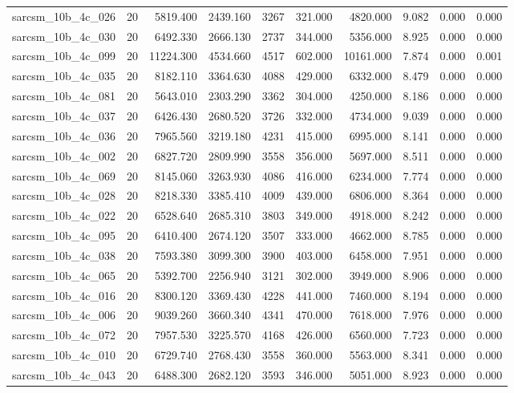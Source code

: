 \begin{tabular}{lrrrrrrrrr}
sarcsm\_10b\_4c\_026 & 20 & 5819.400 & 2439.160 & 3267 & 321.000 & 4820.000 & 9.082 & 0.000 & 0.000 \\
sarcsm\_10b\_4c\_030 & 20 & 6492.330 & 2666.130 & 2737 & 344.000 & 5356.000 & 8.925 & 0.000 & 0.000 \\
sarcsm\_10b\_4c\_099 & 20 & 11224.300 & 4534.660 & 4517 & 602.000 & 10161.000 & 7.874 & 0.000 & 0.001 \\
sarcsm\_10b\_4c\_035 & 20 & 8182.110 & 3364.630 & 4088 & 429.000 & 6332.000 & 8.479 & 0.000 & 0.000 \\
sarcsm\_10b\_4c\_081 & 20 & 5643.010 & 2303.290 & 3362 & 304.000 & 4250.000 & 8.186 & 0.000 & 0.000 \\
sarcsm\_10b\_4c\_037 & 20 & 6426.430 & 2680.520 & 3726 & 332.000 & 4734.000 & 9.039 & 0.000 & 0.000 \\
sarcsm\_10b\_4c\_036 & 20 & 7965.560 & 3219.180 & 4231 & 415.000 & 6995.000 & 8.141 & 0.000 & 0.000 \\
sarcsm\_10b\_4c\_002 & 20 & 6827.720 & 2809.990 & 3558 & 356.000 & 5697.000 & 8.511 & 0.000 & 0.000 \\
sarcsm\_10b\_4c\_069 & 20 & 8145.060 & 3263.930 & 4086 & 416.000 & 6234.000 & 7.774 & 0.000 & 0.000 \\
sarcsm\_10b\_4c\_028 & 20 & 8218.330 & 3385.410 & 4009 & 439.000 & 6806.000 & 8.364 & 0.000 & 0.000 \\
sarcsm\_10b\_4c\_022 & 20 & 6528.640 & 2685.310 & 3803 & 349.000 & 4918.000 & 8.242 & 0.000 & 0.000 \\
sarcsm\_10b\_4c\_095 & 20 & 6410.400 & 2674.120 & 3507 & 333.000 & 4662.000 & 8.785 & 0.000 & 0.000 \\
sarcsm\_10b\_4c\_038 & 20 & 7593.380 & 3099.300 & 3900 & 403.000 & 6458.000 & 7.951 & 0.000 & 0.000 \\
sarcsm\_10b\_4c\_065 & 20 & 5392.700 & 2256.940 & 3121 & 302.000 & 3949.000 & 8.906 & 0.000 & 0.000 \\
sarcsm\_10b\_4c\_016 & 20 & 8300.120 & 3369.430 & 4228 & 441.000 & 7460.000 & 8.194 & 0.000 & 0.000 \\
sarcsm\_10b\_4c\_006 & 20 & 9039.260 & 3660.340 & 4341 & 470.000 & 7618.000 & 7.976 & 0.000 & 0.000 \\
sarcsm\_10b\_4c\_072 & 20 & 7957.530 & 3225.570 & 4168 & 426.000 & 6560.000 & 7.723 & 0.000 & 0.000 \\
sarcsm\_10b\_4c\_010 & 20 & 6729.740 & 2768.430 & 3558 & 360.000 & 5563.000 & 8.341 & 0.000 & 0.000 \\
sarcsm\_10b\_4c\_043 & 20 & 6488.300 & 2682.120 & 3593 & 346.000 & 5051.000 & 8.923 & 0.000 & 0.000 \\

\end{tabular}
